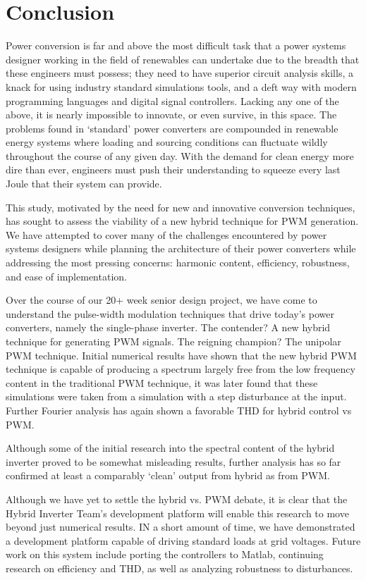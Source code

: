 \section{Conclusion}
Power conversion is far and above the most difficult task that a power systems designer working in the field of renewables can undertake due to the breadth that these engineers must possess; they need to have superior circuit analysis skills, a knack for using industry standard simulations tools, and a deft way with modern programming languages and digital signal controllers. Lacking any one of the above, it is nearly impossible to innovate, or even survive, in this space. The problems found in `standard' power converters are compounded in renewable energy systems where loading and sourcing conditions can fluctuate wildly throughout the course of any given day. With the demand for clean energy more dire than ever, engineers must push their understanding to squeeze every last Joule that their system can provide.

This study, motivated by the need for new and innovative conversion techniques, has sought to assess the viability of a new hybrid technique for PWM generation. We have attempted to cover many of the challenges encountered by power systems designers while planning the architecture of their power converters while addressing the most pressing concerns: harmonic content, efficiency, robustness, and ease of implementation.

Over the course of our 20+ week senior design project, we have come to understand the pulse-width modulation techniques that drive today's power converters, namely the single-phase inverter. The contender? A new hybrid technique for generating PWM signals. The reigning champion? The unipolar PWM technique. Initial numerical results have shown that the new hybrid PWM technique is capable of producing a spectrum largely free from the low frequency content in the traditional PWM technique, it was later found that these simulations were taken from a simulation with a step disturbance at the input. Further Fourier analysis has again shown a favorable THD for hybrid control vs PWM. 

Although some of the initial research into the spectral content of the hybrid inverter proved to be somewhat misleading results, further analysis has so far confirmed at least a comparably `clean' output from hybrid as from PWM.

Although we have yet to settle the hybrid vs. PWM debate, it is clear that the Hybrid Inverter Team's development platform will enable this research to move beyond just numerical results. IN a short amount of time, we have demonstrated a development platform capable of driving standard loads at grid voltages. Future work on this system include porting the controllers to Matlab, continuing research on efficiency and THD, as well as analyzing robustness to disturbances. 